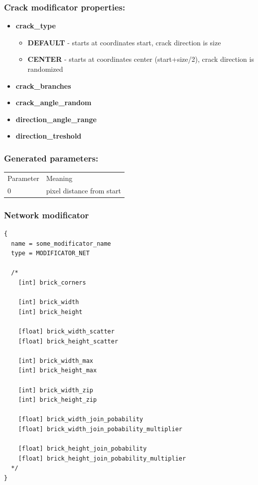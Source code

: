 \documentclass[9pt]{article}
\begin{document}
\subsubsection*{Crack modificator properties:}
\begin{itemize}
\item{\bf crack\_type}
\begin{itemize}
\item{\bf DEFAULT} - starts at coordinates start, crack direction is size
\item{\bf CENTER} - starts at coordinates center (start+size/2), 
crack direction is randomized
\end{itemize}
\item{\bf crack\_branches}
\item{\bf crack\_angle\_random}
\item{\bf direction\_angle\_range}
\item{\bf direction\_treshold}
\end{itemize}

\subsubsection*{Generated parameters:}

\begin{tabular}{|l||l|}
  Parameter & Meaning \\
  0 & pixel distance from start \\
\end{tabular}

\subsubsection{Network modificator}

\begin{verbatim}
{
  name = some_modificator_name
  type = MODIFICATOR_NET

  /*
    [int] brick_corners
        
    [int] brick_width
    [int] brick_height
        
    [float] brick_width_scatter
    [float] brick_height_scatter
        
    [int] brick_width_max
    [int] brick_height_max
        
    [int] brick_width_zip
    [int] brick_height_zip
        
    [float] brick_width_join_pobability
    [float] brick_width_join_pobability_multiplier
        
    [float] brick_height_join_pobability
    [float] brick_height_join_pobability_multiplier
  */
}
\end{verbatim}
\end{document}
